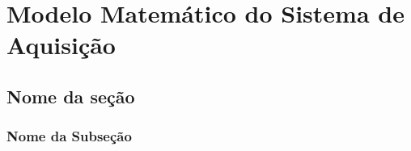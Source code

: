 
\chapter{Modelo Matemático do Sistema de Aquisição}


\section{Nome da seção}



\subsection{Nome da Subseção}




